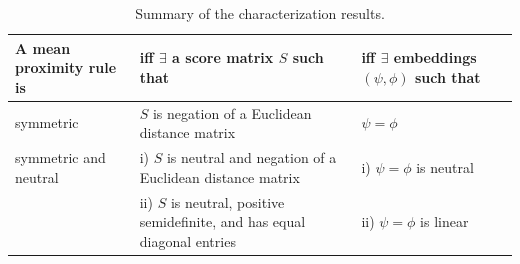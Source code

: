\documentclass[prodmode,acmec]{ec-acmsmall}
\begin{document}
\begin{table}[ht]
\centering
\begin{tabular}{ | p{3.5cm} | p{4cm} | p{3.5cm} | }
\hline
\rule{0pt}{3ex}\textbf{A mean proximity rule is} & \textbf{iff $\boldsymbol{\exists}$ a score matrix $S$ such that} & \textbf{iff $\exists$ embeddings $(\psi,\phi)$ such that} \\[0.1cm] 
\hline 
\rule{0pt}{3ex}symmetric & $S$ is negation of a Euclidean distance matrix & $\psi = \phi$ \\[0.1cm]
\hline
\rule{0pt}{3ex}\multirow{2}{*} {symmetric and neutral} & i) $S$ is neutral and negation of a Euclidean distance matrix & i) $\psi = \phi$ is neutral\\
& ii) $S$ is neutral, positive semidefinite, and has equal diagonal entries & ii) $\psi = \phi$ is linear \\[0.1cm]
\hline
\end{tabular}
\captionsetup{width=\textwidth}
\caption{Summary of the characterization results.}
\label{tab:summary}
\end{table}
\end{document}
